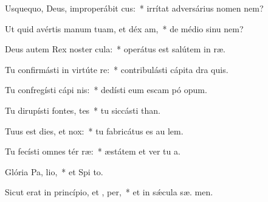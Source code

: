 \item Usquequo, Deus, improperábit cus:~* irrítat adversárius nomen   nem?
\item Ut quid avértis manum tuam, et déx am,~* de médio sinu   nem?
\item Deus autem Rex noster  cula:~* operátus est salútem in  ræ.
\item Tu confirmásti in virtúte  re:~* contribulásti cápita dra  quis.
\item Tu confregísti cápi nis:~* dedísti eum escam pó opum.
\item Tu dirupísti fontes,  tes~* tu siccásti  than.
\item Tuus est dies, et   nox:~* tu fabricátus es au  lem.
\item Tu fecísti omnes tér ræ:~* æstátem et ver tu  a.
\item Glória Pa,  lio,~* et Spi to.
\item Sicut erat in princípio, et ,  per,~* et in sǽcula sæ. men.

